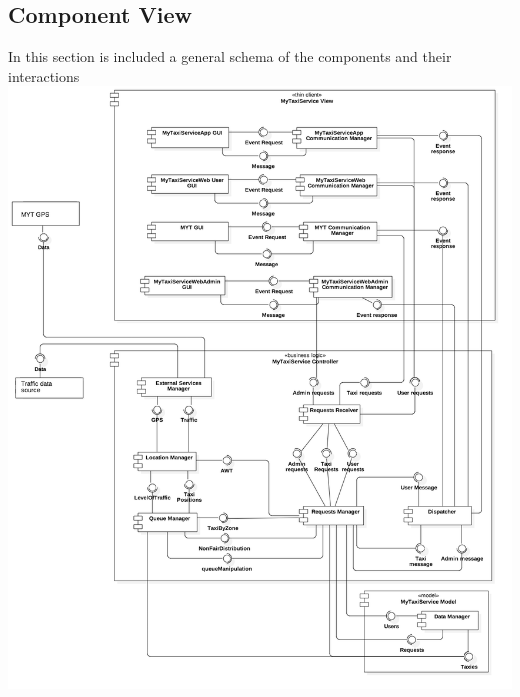 \documentclass[11pt,titlepage]{article} %
\newenvironment{changemargin}[3]{%
\begin{list}{}{%
\setlength{\topsep}{0pt}%
\setlength{\headsep}{#3}%
\setlength{\leftmargin}{#1}%
\setlength{\rightmargin}{#2}%
\setlength{\listparindent}{\parindent}%
\setlength{\itemindent}{\parindent}%
\setlength{\parsep}{\parskip}%
}%
\item[]}{\end{list}}
\begin{document}
\newpage
\begin{changemargin}{-1cm}{0cm}{0pt}
\subsection{Component View}
In this section is included a general schema of the components and their interactions\newline
	\includegraphics[scale=0.42]{component.png}
\end{changemargin}
\newpage
\end{document}
